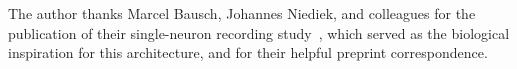 \documentclass[11pt,a4paper]{article}
\theoremstyle{definition}
\begin{document}
The author thanks Marcel Bausch, Johannes Niediek, and colleagues for the publication of their single-neuron recording study~\cite{bausch2026distinct}, which served as the biological inspiration for this architecture, and for their helpful preprint correspondence.



\end{document}
